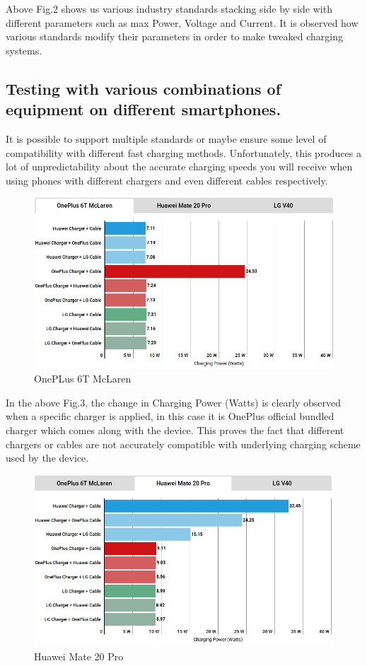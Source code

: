 \documentclass[conference]{IEEEtran}
\begin{document}
Above Fig.2 shows us various industry standards stacking side by side with different parameters such as max Power, Voltage and Current. It is observed how various standards modify their parameters in order to make tweaked charging systems. 

\subsection{Testing with various combinations of equipment on different smartphones.}

It is possible to support multiple standards or maybe ensure some level of compatibility with different fast charging methods. Unfortunately, this produces a lot of unpredictability about the accurate charging speeds you will receive when using phones with different chargers and even different cables respectively.

\begin{figure}[h!]
  \includegraphics[width=\linewidth]{images/image3.png}
  \caption{OnePLus 6T McLaren\cite{b13}}
\end{figure}


In the above Fig.3, the change in Charging Power (Watts) is clearly observed when a specific charger is applied, in this case it is OnePlus official bundled charger which comes along with the device. This proves the fact that different chargers or cables are not accurately compatible with underlying charging scheme used by the device.

\begin{figure}[h!]
  \includegraphics[width=\linewidth]{images/image4.png}
  \caption{Huawei Mate 20 Pro\cite{b13}}
\end{figure}
\end{document}
